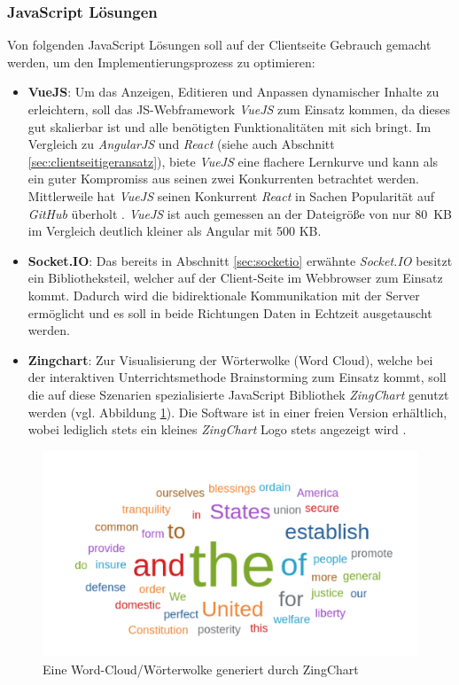 \subsubsection{JavaScript Lösungen}\label{sec:clientjs}
Von folgenden JavaScript Lösungen soll auf der Clientseite Gebrauch gemacht werden, um den Implementierungsprozess zu optimieren:
\begin{itemize}
	\item \textbf{VueJS}: Um das Anzeigen, Editieren und Anpassen dynamischer Inhalte zu erleichtern, soll das JS-Webframework \emph{VueJS} \cite{You2019} zum Einsatz kommen, da dieses gut skalierbar ist und alle benötigten Funktionalitäten mit sich bringt. Im Vergleich zu \emph{AngularJS} und \emph{React} (siehe auch Abschnitt \ref{sec:clientseitigeransatz}), biete \emph{VueJS} eine flachere Lernkurve und kann als ein guter Kompromiss aus seinen zwei Konkurrenten betrachtet werden. Mittlerweile hat \emph{VueJS} seinen Konkurrent \emph{React} in Sachen Popularität auf \emph{GitHub} überholt \cite{Daityari2019}. \emph{VueJS} ist auch gemessen an der Dateigröße von nur 80~KB im Vergleich deutlich kleiner als Angular mit 500 KB.
	\item \textbf{Socket.IO}: Das bereits in Abschnitt \ref{sec:socketio} erwähnte \emph{Socket.IO} besitzt ein Bibliotheksteil, welcher auf der Client-Seite im Webbrowser zum Einsatz kommt. Dadurch wird die bidirektionale Kommunikation mit der Server ermöglicht und es soll in beide Richtungen Daten in Echtzeit ausgetauscht werden. 
	\item \textbf{Zingchart}: Zur Visualisierung der Wörterwolke (Word Cloud), welche bei der interaktiven Unterrichtsmethode Brainstorming zum Einsatz kommt, soll die auf diese Szenarien spezialisierte JavaScript Bibliothek \emph{ZingChart} genutzt werden (vgl. Abbildung \ref{fig:wordcloud}). Die Software ist in einer freien Version erhältlich, wobei lediglich stets ein kleines \emph{ZingChart} Logo stets angezeigt wird \cite{zingchartpricing}.
\end{itemize}

\begin{figure}[H]
	\centering
	\includegraphics[width=0.8\linewidth]{bilder/wordcloud}
	\caption[ZingChart Word-Cloud]{Eine Word-Cloud/Wörterwolke generiert durch ZingChart \cite{ZingSoft2019}}
	\label{fig:wordcloud}
\end{figure}

